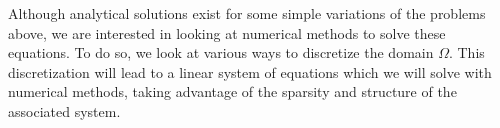 Although analytical solutions exist for some simple variations of the problems above, we are interested in looking at numerical methods to solve these equations. To do so, we look at various ways to discretize the domain $\Omega$. This discretization will lead to a linear system of equations which we will solve with numerical methods, taking advantage of the sparsity and structure of the associated system.